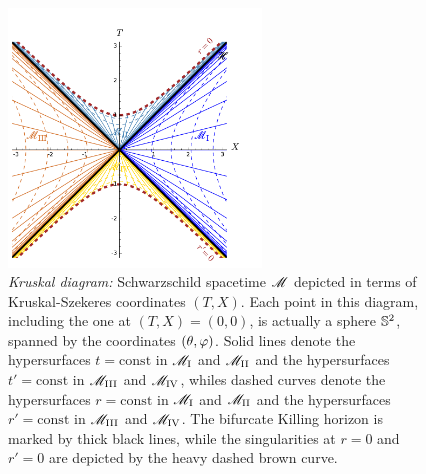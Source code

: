 \begin{figure}
\centerline{\includegraphics[width=0.6\textwidth]{sch_kruskal_diag.pdf}}
\caption[]{\label{f:sch:kruskal_diag} \footnotesize
\emph{Kruskal diagram:}
Schwarzschild spacetime $\mathscr{M}$ depicted in terms of Kruskal-Szekeres coordinates $(T,X)$.
Each point in this diagram, including the one at $(T,X)=(0,0)$,
is actually a sphere $\mathbb{S}^2$, spanned by the
coordinates $(\theta,\varphi)$.
Solid lines denote the hypersurfaces $t=\mathrm{const}$ in $\mathscr{M}_{\rm I}$ and
$\mathscr{M}_{\rm II}$ and the  hypersurfaces $t'=\mathrm{const}$ in $\mathscr{M}_{\rm III}$ and
$\mathscr{M}_{\rm IV}$, whiles dashed curves
denote the hypersurfaces $r=\mathrm{const}$ in $\mathscr{M}_{\rm I}$ and
$\mathscr{M}_{\rm II}$ and the  hypersurfaces $r'=\mathrm{const}$ in $\mathscr{M}_{\rm III}$ and
$\mathscr{M}_{\rm IV}$.
The bifurcate Killing horizon is marked by thick black lines, while the
singularities at $r=0$ and $r'=0$ are depicted by the heavy dashed brown curve.}
\end{figure}

